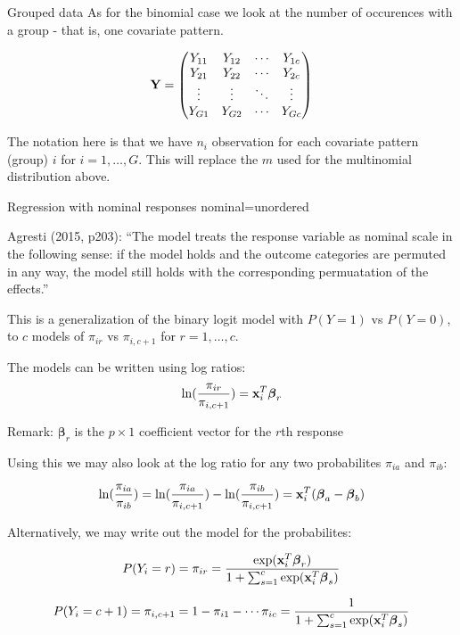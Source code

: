 \documentclass[
  ignorenonframetext,
]{beamer}
\begin{document}
\begin{frame}
\begin{block}{Grouped data}
\label{grouped-data}
As for the binomial case we look at the number of occurences with a
group - that is, one covariate pattern.

\[{\bf Y}=\begin{pmatrix} Y_{11}& Y_{12} & \cdots & Y_{1c}\\
Y_{21}& Y_{22} & \cdots & Y_{2c}\\
\vdots & \vdots & \ddots & \vdots\\
Y_{G1}& Y_{G2} & \cdots & Y_{Gc}\\
\end{pmatrix}\]

The notation here is that we have \(n_i\) observation for each covariate
pattern (group) \(i\) for \(i=1,\ldots,G\). This will replace the \(m\)
used for the multinomial distribution above.
\end{block}
\end{frame}

\begin{frame}{Regression with nominal responses}
\label{regression-with-nominal-responses}
nominal=unordered

Agresti (2015, p203): ``The model treats the response variable as
nominal scale in the following sense: if the model holds and the outcome
categories are permuted in any way, the model still holds with the
corresponding permuatation of the effects.''
\end{frame}

\begin{frame}
This is a generalization of the binary logit model with \(P(Y=1)\) vs
\(P(Y=0)\), to \(c\) models of \(\pi_{ir}\) vs \(\pi_{i,c+1}\) for
\(r=1,\ldots,c\).

The models can be written using log ratios:
\[ \ln(\frac{\pi_{ir}}{\pi_{i,c+1}})={\bf x}_i^T {\boldsymbol \beta}_r\]

Remark: \({\boldsymbol \beta}_r\) is the \(p\times 1\) coefficient
vector for the \(r\)th response

Using this we may also look at the log ratio for any two probabilites
\(\pi_{ia}\) and \(\pi_{ib}\):

\[\ln(\frac{\pi_{ia}}{\pi_{ib}})=\ln(\frac{\pi_{ia}}{\pi_{i,c+1}})-\ln(\frac{\pi_{ib}}{\pi_{i,c+1}})={\bf x}_i^T ({\boldsymbol \beta}_a-{\boldsymbol \beta}_b)\]
\end{frame}

\begin{frame}
Alternatively, we may write out the model for the probabilites:

\[P(Y_i=r)=\pi_{ir}=\frac{\exp({\bf x}_i^T {\boldsymbol\beta}_r)}{1+\sum_{s=1}^{c}\exp({\bf x}_i^T {\boldsymbol\beta}_s)}\]

\[P(Y_i=c+1)=\pi_{i,c+1}=1-\pi_{i1}-\cdots \pi_{ic}=\frac{1}{1+\sum_{s=1}^{c}\exp({\bf x}_i^T {\boldsymbol\beta}_s)}\]
\end{frame}
\end{document}
